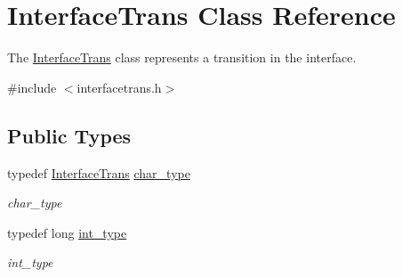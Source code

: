 \hypertarget{class_interface_trans}{}\section{Interface\+Trans Class Reference}
\label{class_interface_trans}


The \hyperlink{class_interface_trans}{Interface\+Trans} class represents a transition in the interface.  




{\ttfamily \#include $<$interfacetrans.\+h$>$}

\subsection*{Public Types}
\begin{DoxyCompactItemize}
\item 
typedef \hyperlink{class_interface_trans}{Interface\+Trans} \hyperlink{class_interface_trans_a4c87e8d04c2749f9e2b619333cdc6245}{char\+\_\+type}\hypertarget{class_interface_trans_a4c87e8d04c2749f9e2b619333cdc6245}{}\label{class_interface_trans_a4c87e8d04c2749f9e2b619333cdc6245}

\begin{DoxyCompactList}\small\item\em char\+\_\+type \end{DoxyCompactList}\item 
typedef long \hyperlink{class_interface_trans_a1ee5ca8331aafbef2d8260d56c3fe892}{int\+\_\+type}\hypertarget{class_interface_trans_a1ee5ca8331aafbef2d8260d56c3fe892}{}\label{class_interface_trans_a1ee5ca8331aafbef2d8260d56c3fe892}

\begin{DoxyCompactList}\small\item\em int\+\_\+type \end{DoxyCompactList}\end{DoxyCompactItemize}
